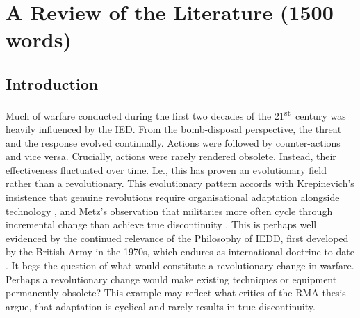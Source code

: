 \chapter{A Review of the Literature (1500 words)}

\section{Introduction}Much of warfare conducted during the first two decades of the 21\textsuperscript{st}~century was heavily influenced by the IED. From the bomb-disposal perspective, the threat and the response evolved continually. Actions were followed by counter-actions and vice versa. Crucially, actions were rarely rendered obsolete. Instead, their effectiveness fluctuated over time. I.e., this has proven an evolutionary field rather than a revolutionary. This evolutionary pattern accords with Krepinevich’s insistence that genuine revolutions require organisational adaptation alongside technology \parencite{KREP_1992}, and Metz’s observation that militaries more often cycle through incremental change than achieve true discontinuity \parencite{METZ_2000,KREP_1994}. This is perhaps well evidenced by the continued relevance of the Philosophy of IEDD, first developed by the British Army in the 1970s, which endures as international doctrine to-date  \parencite{COCHRANE_2012,DORD_2022}. It begs the question of what would constitute a revolutionary change in warfare. Perhaps a revolutionary change would make existing techniques or equipment permanently obsolete? This example may reflect what critics of the RMA thesis argue, that adaptation is cyclical and rarely results in true discontinuity. %

 

